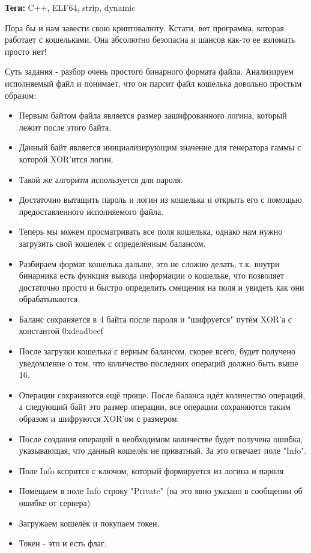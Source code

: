 \documentclass[idxtotoc,hyperref,openany,oneside]{files/reverse} %
\begin{document}



\textbf{Теги:} C++, ELF64, strip, dynamic\vspace{\baselineskip}

\begin{tcolorbox}
Пора бы и нам завести свою криптовалюту. Кстати, вот программа, которая работает с кошельками. Она абсолютно безопасна и шансов как-то ее взломать просто нет!
\end{tcolorbox}

Суть задания - разбор очень простого бинарного формата файла. Анализируем исполняемый файл и понимает, что он парсит файл кошелька довольно простым образом:
\begin{itemize}
\item Первым байтом файла является размер зашифрованного логина, который лежит после этого байта.
\item Данный байт является инициализирующим значение для генератора гаммы с которой XOR'ится логин.
\item Такой же алгоритм используется для пароля.
\item Достаточно вытащить пароль и логин из кошелька и открыть его с помощью предоставленного исполняемого файла.
\item Теперь мы можем просматривать все поля кошелька, однако нам нужно загрузить свой кошелёк с определённым балансом.
\item Разбираем формат кошелька дальше, это не сложно делать, т.к. внутри бинарника есть функция вывода информации о кошельке, что позволяет достаточно просто и быстро определить смещения на поля и увидеть как они обрабатываются.
\item Баланс сохраняется в 4 байта после пароля и "шифруется" путём XOR'а с константой 0xdeadbeef
\item После загрузки кошелька с верным балансом, скорее всего, будет получено уведомление о том, что количество последних операций должно быть выше 16.
\item Операции сохраняются ещё проще. После баланса идёт количество операций, а следующий байт это размер операции, все операции сохраняются таким образом и шифруются XOR'ом с размером.
\item После создания операций в необходимом количестве будет получена ошибка, указывающая, что данный кошелёк не приватный. За это отвечает поле "Info".
\item Поле Info ксорится с ключом, который формируется из логина и пароля
\item Помещаем в поле Info строку "Private" (на это явно указано в сообщении об ошибке от сервера)
\item Загружаем кошелёк и покупаем токен.
\item Токен - это и есть флаг.
\end{itemize}
\end{document}
